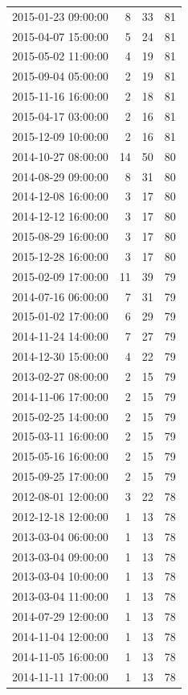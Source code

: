 \begin{tabular}{lrrr}
2015-01-23 09:00:00 & 8 & 33 & 81 \\
2015-04-07 15:00:00 & 5 & 24 & 81 \\
2015-05-02 11:00:00 & 4 & 19 & 81 \\
2015-09-04 05:00:00 & 2 & 19 & 81 \\
2015-11-16 16:00:00 & 2 & 18 & 81 \\
2015-04-17 03:00:00 & 2 & 16 & 81 \\
2015-12-09 10:00:00 & 2 & 16 & 81 \\
2014-10-27 08:00:00 & 14 & 50 & 80 \\
2014-08-29 09:00:00 & 8 & 31 & 80 \\
2014-12-08 16:00:00 & 3 & 17 & 80 \\
2014-12-12 16:00:00 & 3 & 17 & 80 \\
2015-08-29 16:00:00 & 3 & 17 & 80 \\
2015-12-28 16:00:00 & 3 & 17 & 80 \\
2015-02-09 17:00:00 & 11 & 39 & 79 \\
2014-07-16 06:00:00 & 7 & 31 & 79 \\
2015-01-02 17:00:00 & 6 & 29 & 79 \\
2014-11-24 14:00:00 & 7 & 27 & 79 \\
2014-12-30 15:00:00 & 4 & 22 & 79 \\
2013-02-27 08:00:00 & 2 & 15 & 79 \\
2014-11-06 17:00:00 & 2 & 15 & 79 \\
2015-02-25 14:00:00 & 2 & 15 & 79 \\
2015-03-11 16:00:00 & 2 & 15 & 79 \\
2015-05-16 16:00:00 & 2 & 15 & 79 \\
2015-09-25 17:00:00 & 2 & 15 & 79 \\
2012-08-01 12:00:00 & 3 & 22 & 78 \\
2012-12-18 12:00:00 & 1 & 13 & 78 \\
2013-03-04 06:00:00 & 1 & 13 & 78 \\
2013-03-04 09:00:00 & 1 & 13 & 78 \\
2013-03-04 10:00:00 & 1 & 13 & 78 \\
2013-03-04 11:00:00 & 1 & 13 & 78 \\
2014-07-29 12:00:00 & 1 & 13 & 78 \\
2014-11-04 12:00:00 & 1 & 13 & 78 \\
2014-11-05 16:00:00 & 1 & 13 & 78 \\
2014-11-11 17:00:00 & 1 & 13 & 78 \\

\end{tabular}
